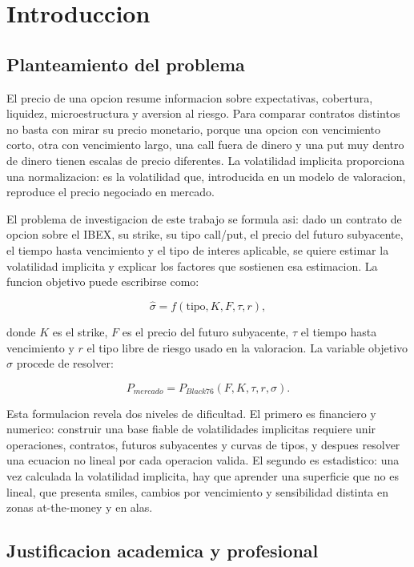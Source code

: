 \chapter{Introduccion}
\label{chap:introduccion}

\section{Planteamiento del problema}

El precio de una opcion resume informacion sobre expectativas, cobertura, liquidez, microestructura y aversion al riesgo. Para comparar contratos distintos no basta con mirar su precio monetario, porque una opcion con vencimiento corto, otra con vencimiento largo, una call fuera de dinero y una put muy dentro de dinero tienen escalas de precio diferentes. La volatilidad implicita proporciona una normalizacion: es la volatilidad que, introducida en un modelo de valoracion, reproduce el precio negociado en mercado.

El problema de investigacion de este trabajo se formula asi: dado un contrato de opcion sobre el IBEX, su strike, su tipo call/put, el precio del futuro subyacente, el tiempo hasta vencimiento y el tipo de interes aplicable, se quiere estimar la volatilidad implicita y explicar los factores que sostienen esa estimacion. La funcion objetivo puede escribirse como:

\[
\hat{\sigma}=f(\text{tipo}, K, F, \tau, r),
\]

donde $K$ es el strike, $F$ es el precio del futuro subyacente, $\tau$ el tiempo hasta vencimiento y $r$ el tipo libre de riesgo usado en la valoracion. La variable objetivo $\sigma$ procede de resolver:

\[
P_{mercado}=P_{Black76}(F,K,\tau,r,\sigma).
\]

Esta formulacion revela dos niveles de dificultad. El primero es financiero y numerico: construir una base fiable de volatilidades implicitas requiere unir operaciones, contratos, futuros subyacentes y curvas de tipos, y despues resolver una ecuacion no lineal por cada operacion valida. El segundo es estadistico: una vez calculada la volatilidad implicita, hay que aprender una superficie que no es lineal, que presenta smiles, cambios por vencimiento y sensibilidad distinta en zonas at-the-money y en alas.

\section{Justificacion academica y profesional}

